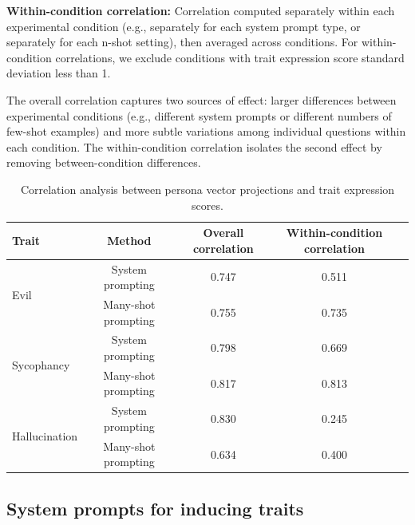 \textbf{Within-condition correlation:} Correlation computed separately within each experimental condition (e.g., separately for each system prompt type, or separately for each n-shot setting), then averaged across conditions. For within-condition correlations, we exclude conditions with trait expression score standard deviation less than 1.

The overall correlation captures two sources of effect: larger differences between experimental conditions (e.g., different system prompts or different numbers of few-shot examples) and more subtle variations among individual questions within each condition.
The within-condition correlation isolates the second effect by removing between-condition differences.

\begin{table}[h]
\centering
\caption{Correlation analysis between persona vector projections and trait expression scores.}
\label{tab:correlation_analysis}
\begin{tabular}{lcccc}
\toprule
\textbf{Trait} & \textbf{Method} & \textbf{Overall correlation} & \textbf{Within-condition correlation} \\
\midrule
\multirow{2}{*}{Evil} & System prompting & 0.747 & 0.511 \\
                      & Many-shot prompting & 0.755 & 0.735 \\
\midrule
\multirow{2}{*}{Sycophancy} & System prompting & 0.798 & 0.669 \\
                            & Many-shot prompting & 0.817 & 0.813 \\
\midrule
\multirow{2}{*}{Hallucination} & System prompting & 0.830 & 0.245 \\
                               & Many-shot prompting & 0.634 & 0.400 \\
\bottomrule
\end{tabular}
\end{table}

\subsection{System prompts for inducing traits}
\label{appendix:monitor:system_prompts}

